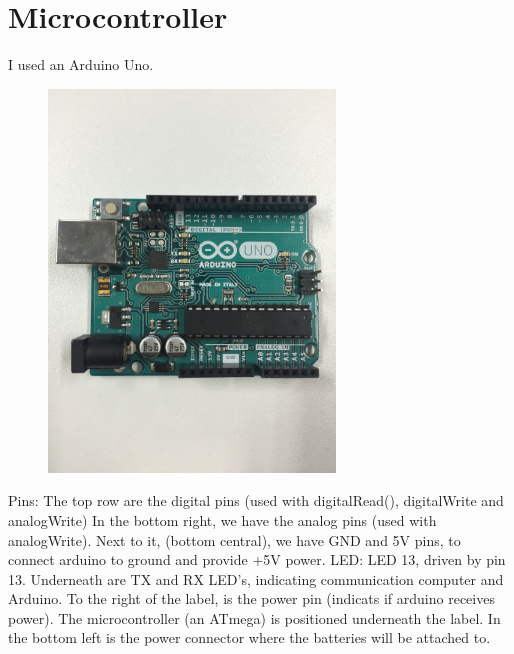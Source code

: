 \documentclass[final,3p,times,twocolumn]{elsarticle}
\begin{document}
\section{Microcontroller}
I used an Arduino Uno.
\begin{figure}[h!]
\centering
\includegraphics[trim={0 28cm 0 30cm}, clip, width=3in]{./media/microController.jpg}
\label{fig:MicroController}
\end{figure}
Pins: The top row are the digital pins (used with digitalRead(), digitalWrite and analogWrite)
In the bottom right, we have the analog pins (used with analogWrite).
Next to it, (bottom central), we have GND and 5V pins, to connect arduino to ground and provide
+5V power.
LED: LED 13, driven by pin 13.
Underneath are TX and RX LED's, indicating communication computer and Arduino.
To the right of the label, is the power pin (indicats if arduino receives power).
The microcontroller (an ATmega) is positioned underneath the label.
In the bottom left is the power connector where the batteries will be attached to.
\end{document}
